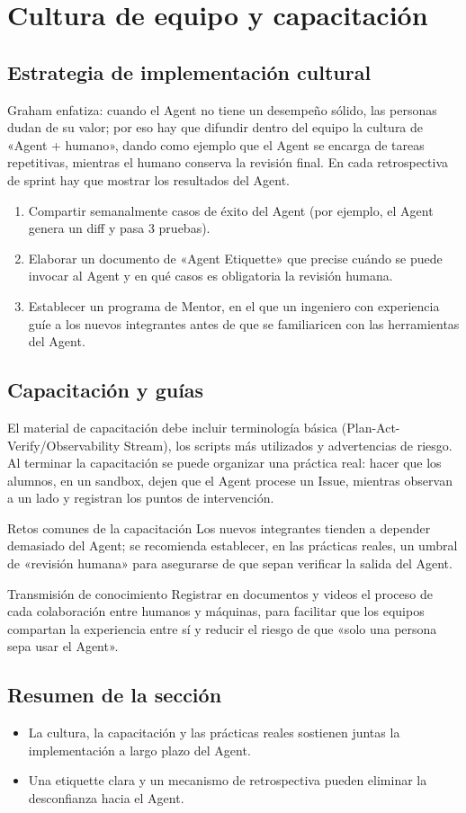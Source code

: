 \section{Cultura de equipo y capacitación}
\subsection{Estrategia de implementación cultural}
Graham enfatiza: cuando el Agent no tiene un desempeño sólido, las personas dudan de su valor; por eso hay que difundir dentro del equipo la cultura de «Agent + humano», dando como ejemplo que el Agent se encarga de tareas repetitivas, mientras el humano conserva la revisión final. En cada retrospectiva de sprint hay que mostrar los resultados del Agent.

\begin{enumerate}
    \item Compartir semanalmente casos de éxito del Agent (por ejemplo, el Agent genera un diff y pasa 3 pruebas).
    \item Elaborar un documento de «Agent Etiquette» que precise cuándo se puede invocar al Agent y en qué casos es obligatoria la revisión humana.
    \item Establecer un programa de Mentor, en el que un ingeniero con experiencia guíe a los nuevos integrantes antes de que se familiaricen con las herramientas del Agent.
\end{enumerate}

\subsection{Capacitación y guías}
El material de capacitación debe incluir terminología básica (Plan-Act-Verify/Observability Stream), los scripts más utilizados y advertencias de riesgo. Al terminar la capacitación se puede organizar una práctica real: hacer que los alumnos, en un sandbox, dejen que el Agent procese un Issue, mientras observan a un lado y registran los puntos de intervención.

\begin{warningbox}{Retos comunes de la capacitación}
Los nuevos integrantes tienden a depender demasiado del Agent; se recomienda establecer, en las prácticas reales, un umbral de «revisión humana» para asegurarse de que sepan verificar la salida del Agent.
\end{warningbox}

\begin{knowledgebox}{Transmisión de conocimiento}
Registrar en documentos y videos el proceso de cada colaboración entre humanos y máquinas, para facilitar que los equipos compartan la experiencia entre sí y reducir el riesgo de que «solo una persona sepa usar el Agent».
\end{knowledgebox}

\subsection{Resumen de la sección}
\begin{itemize}
    \item La cultura, la capacitación y las prácticas reales sostienen juntas la implementación a largo plazo del Agent.
    \item Una etiquette clara y un mecanismo de retrospectiva pueden eliminar la desconfianza hacia el Agent.
\end{itemize}

